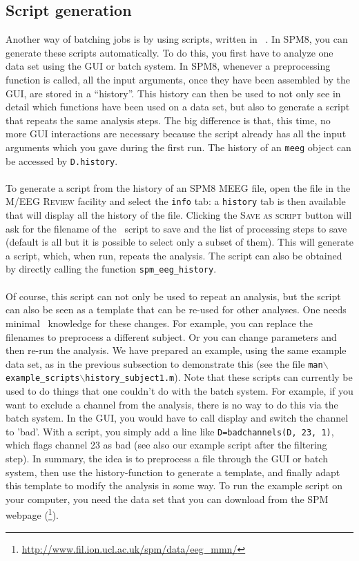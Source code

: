 \subsection{Script generation}
Another way of batching jobs is by using scripts, written in \matlab\ . In SPM8, you can generate these scripts automatically. To do this, you first have to analyze one data set using the GUI or batch system. In SPM8, whenever a preprocessing function is called, all the input arguments, once they have been assembled by the GUI, are stored in a ``history''. This history can then be used to not only see in detail which functions have been used on a data set, but also to generate a script that repeats the same analysis steps. The big difference is that, this time, no more GUI interactions are necessary because the script already has all the input arguments which you gave during the first run. The history of an \texttt{meeg} object can be accessed by \texttt{D.history}. 
\\
\\
To generate a script from the history of an SPM8 MEEG file, open the file in the M/EEG \textsc{Review} facility and select the \texttt{info} tab: a \texttt{history} tab is then available that will display all the history of the file. Clicking the \textsc{Save as script} button will ask for the filename of the \matlab\ script to save and the list of processing steps to save (default is all but it is possible to select only a subset of them). This will generate a script, which, when run, repeats the analysis. The script can also be obtained by directly calling the function \texttt{spm\_eeg\_history}.
\\
\\
Of course, this script can not only be used to repeat an analysis, but the script can also be seen as a template that can be re-used for other analyses. One needs minimal \matlab\ knowledge for these changes. For example, you can replace the filenames to preprocess a different subject. Or you can change parameters and then re-run the analysis. We have prepared an example, using the same example data set, as in the previous subsection to demonstrate this (see the file \texttt{man$\backslash$example\_scripts$\backslash$history\_subject1.m}). Note that these scripts can currently be used to do things that one couldn't do with the batch system. For example, if you want to exclude a channel from the analysis, there is no way to do this via the batch system. In the GUI, you would have to call display and switch the channel to 'bad'. With a script, you simply add a line like \texttt{D=badchannels(D, 23, 1)}, which flags channel 23 as bad (see also our example script after the filtering step). In summary, the idea is to preprocess a file through the GUI or batch system, then use the history-function to generate a template, and finally adapt this template to modify the analysis in some way. To run the example script on your computer, you need the data set that you can download from the SPM webpage (\footnote{\url{http://www.fil.ion.ucl.ac.uk/spm/data/eeg\_mmn/}}).
